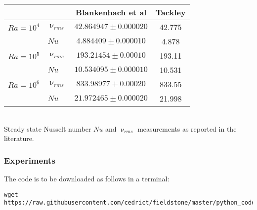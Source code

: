 \begin{center} 
\begin{tabular}{llcc}
\hline
          &           & Blankenbach et al & Tackley \cite{tack94}    \\
\hline
\hline
$Ra=10^4$ & $\upnu_{rms}$ &  $42.864947  \pm 0.000020$ & 42.775 \\
          & $Nu$      &  $4.884409   \pm 0.000010$ & 4.878  \\
$Ra=10^5$ & $\upnu_{rms}$ &  $193.21454  \pm 0.00010 $ & 193.11 \\
          & $Nu$      &  $10.534095  \pm 0.000010$ & 10.531 \\
$Ra=10^6$ & $\upnu_{rms}$ &  $833.98977  \pm 0.00020 $ & 833.55 \\
          & $Nu$      &  $21.972465  \pm 0.000020$ & 21.998 \\
\hline
\end{tabular}\\ 
{\captionfont Steady state Nusselt number $Nu$ and $\upnu_{rms}$ measurements as reported in the literature.} 
\end{center} 




\subsubsection{Experiments}

The code is to be downloaded as follows in a terminal:
\begin{verbatim}
wget https://raw.githubusercontent.com/cedrict/fieldstone/master/python_codes/md/fieldstone_relax.py
\end{verbatim}

